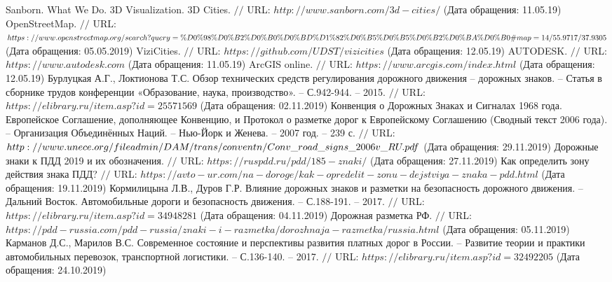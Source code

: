\makeatletter \renewcommand{} \makeatother
\renewcommand\refname{Список использованных источников}
\begin{thebibliography}{00}
	
	Sanborn. What We Do. 3D Visualization. 3D Cities. $//$ URL: $http://www.sanborn.com/3d-cities/$ (Дата обращения: 11.05.19)
	OpenStreetMap. $//$ URL: $https://www.openstreetmap.org/search?\\query=\%D0\%98\%D0\%B2\%D0\%B0\%D0\%BD\%D1\%82\%D0\\\%B5\%D0\%B5\%D0\%B2\%D0\%BA\%D0\%B0\#map=14/55.9717/37.9305$ (Дата обращения: 05.05.2019)
	ViziCities. $//$ URL: $https://github.com/UDST/vizicities$ (Дата обращения: 12.05.19)
	AUTODESK. $//$ URL: $https://www.autodesk.com$ (Дата обращения: 11.05.19)
	ArcGIS online. $//$ URL: $https://www.arcgis.com/index.html$ (Дата обращения: 12.05.19)
	Бурлуцкая А.Г., Локтионова Т.С. Обзор технических средств регулирования дорожного движения -- дорожных знаков. -- Статья в сборнике трудов конференции «Образование, наука, производство». -- С.942-944. -- 2015. $//$ URL: $https://elibrary.ru/item.asp?id=25571569$ (Дата обращения: 02.11.2019)
	Конвенция о Дорожных Знаках и Сигналах 1968 года. Европейское Соглашение, дополняющее Конвенцию, и Протокол о разметке дорог к Европейскому Соглашению (Сводный текст 2006 года). -- Организация Объединённых Наций. -- Нью-Йорк и Женева. -- 2007 год. -- 239 с. $//$ URL: $http://www.unece.org/fileadmin/DAM/trans/conventn/Conv\_road\_\\
	signs\_2006v\_RU.pdf$ (Дата обращения: 29.11.2019)
	Дорожные знаки к ПДД 2019 и их обозначения. $//$ URL: $https://ruspdd.ru/pdd/185-znaki/$ (Дата обращения: 27.11.2019)
	Как определить зону действия знака ПДД? $//$ URL: $https://avto-ur.com/na-doroge/kak-opredelit-zonu-dejstviya-znaka-pdd.html$ (Дата обращения: 19.11.2019)
	Кормилицына Л.В., Дуров Г.Р. Влияние дорожных знаков и разметки на безопасность дорожного движения. -- Дальний Восток. Автомобильные дороги и безопасность движения. -- С.188-191. -- 2017. $//$ URL: $https://elibrary.ru/item.asp?id=34948281$ (Дата обращения: 04.11.2019)
	Дорожная разметка РФ. $//$ URL: $https://pdd-russia.com/pdd-russia/znaki-i-razmetka/dorozhnaja-razmetka/russia.html$ (Дата обращения: 05.11.2019)
	Карманов Д.С., Марилов В.С. Современное состояние и перспективы развития платных дорог в России. -- Развитие теории и практики автомобильных перевозок, транспортной логистики. -- С.136-140. -- 2017. $//$ URL: $https://elibrary.ru/item.asp?id=32492205$ (Дата обращения: 24.10.2019)

\end{thebibliography}
